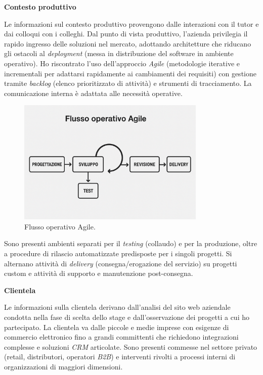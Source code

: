 \medskip
\noindent\textbf{Contesto produttivo}

Le informazioni sul contesto produttivo provengono dalle interazioni con il tutor e dai colloqui con i colleghi. 
Dal punto di vista produttivo, l'azienda privilegia il rapido ingresso delle soluzioni nel mercato, adottando architetture che riducano gli ostacoli al 
\emph{deployment} (messa in distribuzione del software in ambiente operativo). Ho riscontrato l'uso dell'approccio \emph{Agile} (metodologie iterative e incrementali per adattarsi rapidamente ai cambiamenti dei requisiti) 
con gestione tramite \emph{backlog} (elenco prioritizzato di attività) e strumenti di tracciamento. La comunicazione interna è adattata alle necessità operative.

\begin{figure}[htbp]
    \centering
    \includegraphics[width=0.8\textwidth]{images/azienda/metodo_agile}
    \caption{Flusso operativo Agile.}
    \label{fig:agile}
\end{figure}

Sono presenti ambienti separati per il \emph{testing} (collaudo) e per la produzione, oltre a procedure di rilascio automatizzate predisposte per i singoli progetti. 
Si alternano attività di \emph{delivery} (consegna/erogazione del servizio) su progetti custom e attività di supporto e manutenzione post-consegna.

\medskip
\noindent\textbf{Clientela}

Le informazioni sulla clientela derivano dall'analisi del sito web aziendale condotta nella fase di scelta dello stage e dall'osservazione dei progetti a cui ho partecipato. 
La clientela va dalle piccole e medie imprese con esigenze di commercio elettronico fino a grandi committenti che richiedono integrazioni complesse e soluzioni \emph{CRM} articolate. 
Sono presenti commesse nel settore privato (retail, distributori, operatori \emph{B2B}) e interventi rivolti a processi interni di organizzazioni di maggiori dimensioni.

